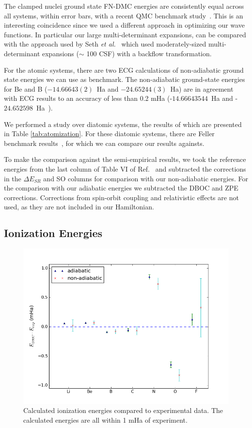 \documentclass[pra,superscriptaddress,groupedaddress,twocolumn]{revtex4}
\begin{document}
The clamped nuclei ground state FN-DMC energies  are consistently equal across all systems, within error bars, with a recent QMC benchmark study~\cite{Seth_Bench}. This is an interesting coincidence since we used a different approach in optimizing our wave functions.   In particular our large multi-determinant expansions, can be compared with the approach used by Seth {\it et al.}~\cite{Seth_Bench} which used moderately-sized multi-determinant expansions ($\sim$ 100 CSF) with a backflow transformation. 
 
 For the atomic systems, there are two ECG calculations of non-adiabatic ground state energies we can use as benchmark.  The non-adiabatic ground-state energies for Be and B ($-14.66643(2)$~Ha and $-24.65244(3)$~Ha) are in agreement with ECG results  to an accuracy of less than 0.2 mHa (-$14.66643544$~Ha \cite{Bubin_BeH_noBO} and -$24.652598$~Ha~\cite{Bubin_BH_noBO}).

We performed a study over diatomic systems, the results of which are presented in Table \ref{tab:atomization}. For these diatomic systems, there are Feller benchmark results~\cite{Feller_Corrections}, for which we can compare our results againsts. 

To make the comparison against the semi-empirical results, we took the reference energies from the last column of Table VI of Ref.~\cite{Feller_Corrections} and subtracted the corrections in the $\Delta E_{SR}$ and SO columns for comparison with our non-adiabatic energies.  For the comparison with our adiabatic energies we subtracted the DBOC and ZPE corrections.  Corrections from spin-orbit coupling and relativistic effects are not used, as they are not included in our Hamiltonian.

\subsection{Ionization Energies}

\begin{figure}[h]
\includegraphics[scale=.4]{Figures/ionization}
\caption{Calculated ionization energies compared to experimental data. The calculated energies are all within 1 mHa of experiment.}
\end{figure}
\end{document}
